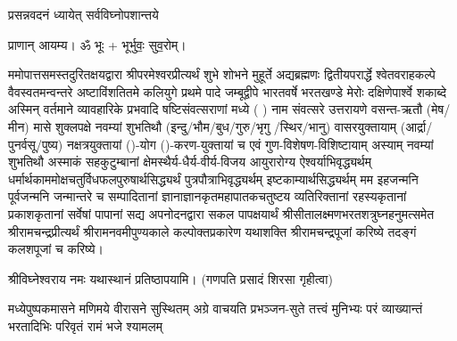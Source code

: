 
\setlength{\parindent}{0pt}





{प्रसन्नवदनं ध्यायेत् सर्वविघ्नोपशान्तये}
 
प्राणान्  आयम्य।  ॐ भूः + भूर्भुवः॒ सुव॒रोम्।


ममोपात्तसमस्तदुरितक्षयद्वारा श्रीपरमेश्वरप्रीत्यर्थं शुभे शोभने मुहूर्ते अद्यब्रह्मणः
द्वितीयपरार्द्धे श्वेतवराहकल्पे वैवस्वतमन्वन्तरे अष्टाविंशतितमे कलियुगे प्रथमे पादे
जम्बूद्वीपे भारतवर्षे भरतखण्डे मेरोः दक्षिणेपार्श्वे शकाब्दे अस्मिन् वर्तमाने व्यावहारिके
 प्रभवादि षष्टिसंवत्सराणां मध्ये (	) नाम संवत्सरे उत्तरायणे वसन्त-ऋतौ  (मेष/मीन) मासे 
शुक्लपक्षे नवम्यां शुभतिथौ (इन्दु/भौम/बुध/गुरु/भृगु /स्थिर/भानु) वासरयुक्तायाम्
(आर्द्रा/पुनर्वसू/पुष्य) नक्षत्रयुक्तायां ()-योग ()-करण-युक्तायां च एवं गुण-विशेषण-विशिष्टायाम्
अस्याम् नवम्यां शुभतिथौ अस्माकं सहकुटुम्बानां क्षेमस्थैर्य-धैर्य-वीर्य-विजय आयुरारोग्य ऐश्वर्याभिवृद्ध्यर्थम्
 धर्मार्थकाममोक्ष\-चतुर्विधफलपुरुषार्थसिद्ध्यर्थं पुत्रपौत्राभिवृद्ध्यर्थम् इष्टकाम्यार्थसिद्ध्यर्थम्
मम इहजन्मनि पूर्वजन्मनि जन्मान्तरे च सम्पादितानां ज्ञानाज्ञानकृतमहा\-पातकचतुष्टय
व्यतिरिक्तानां रहस्यकृतानां प्रकाशकृतानां सर्वेषां पापानां सद्य अपनोदनद्वारा सकल 
पापक्षयार्थं 
श्रीसीतालक्ष्मणभरतशत्रुघ्नहनुमत्समेत श्रीरामचन्द्रप्रीत्यर्थं
श्रीरामनवमीपुण्यकाले कल्पोक्तप्रकारेण यथाशक्ति श्रीरामचन्द्रपूजां
करिष्ये
तदङ्गं कलशपूजां च करिष्ये।


श्रीविघ्नेश्वराय नमः यथास्थानं प्रतिष्ठापयामि।
(गणपति प्रसादं शिरसा गृहीत्वा)












 

{मध्येपुष्पकमासने मणिमये वीरासने सुस्थितम्}
{अग्रे वाचयति प्रभञ्जन-सुते तत्त्वं मुनिभ्यः परं}
{व्याख्यान्तं भरतादिभिः परिवृतं रामं भजे श्यामलम्}

